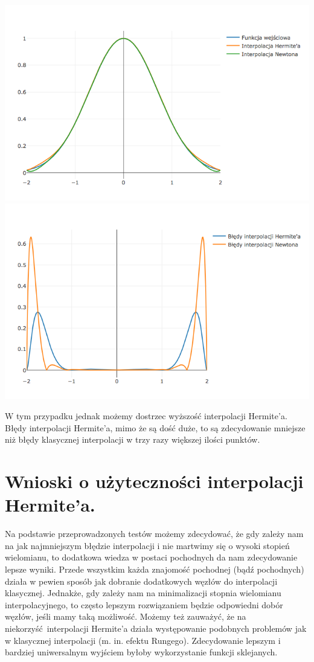 \documentclass[10pt,wide]{mwart}
\theoremstyle{definition}
\begin{document}
\includegraphics[scale=0.7]{eupinter.png}
\includegraphics[scale=0.7]{euperror.png}

W tym przypadku jednak możemy dostrzec wyższość interpolacji Hermite'a.
Błędy interpolacji Hermite'a, mimo że są dość duże, to są zdecydowanie mniejsze niż błędy klasycznej interpolacji w trzy razy większej ilości punktów.

\section{Wnioski o użyteczności interpolacji Hermite'a.}
Na podstawie przeprowadzonych testów możemy zdecydować, że gdy zależy nam na jak najmniejszym błędzie interpolacji i nie martwimy się o wysoki stopień wielomianu,
to dodatkowa wiedza w postaci pochodnych da nam zdecydowanie lepsze wyniki.
Przede wszystkim każda znajomość pochodnej (bądź pochodnych) działa w pewien sposób jak dobranie dodatkowych węzłów do interpolacji klasycznej.
Jednakże, gdy zależy nam na minimalizacji stopnia wielomianu interpolacyjnego, to często lepszym rozwiązaniem będzie odpowiedni dobór węzłów, jeśli mamy taką możliwość.
Możemy też zauważyć, że na niekorzyść interpolacji Hermite'a działa występowanie podobnych problemów jak w klasycznej interpolacji (m. in. efektu Rungego).
Zdecydowanie lepszym i bardziej uniwersalnym wyjściem byłoby wykorzystanie funkcji sklejanych.
\end{document}
